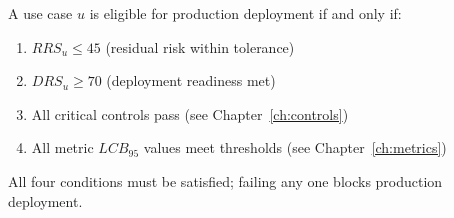 A use case $u$ is eligible for production deployment if and only if:

\begin{enumerate}
  \item $RRS_u \leq 45$ (residual risk within tolerance)
  \item $DRS_u \geq 70$ (deployment readiness met)
  \item All critical controls pass (see Chapter~\ref{ch:controls})
  \item All metric $LCB_{95}$ values meet thresholds (see Chapter~\ref{ch:metrics})
\end{enumerate}

All four conditions must be satisfied; failing any one blocks production
deployment.